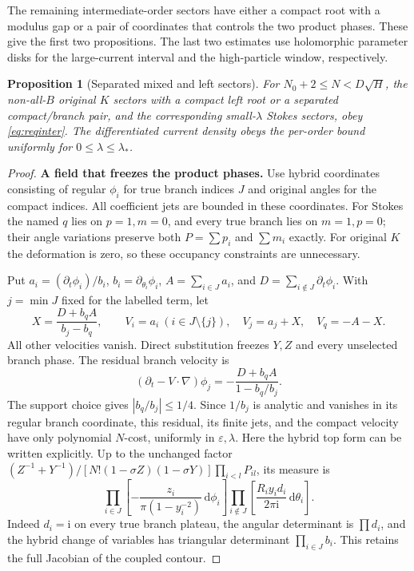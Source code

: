 \documentclass[11pt]{article}
\numberwithin{equation}{section}
\newtheorem{proposition}[theorem]{Proposition}
\theoremstyle{definition}
\newcommand{\dd}{\,\mathrm d}
\newcommand{\ii}{\mathrm i}
\newcommand{\eps}{\varepsilon}
\begin{document}
The remaining intermediate-order sectors have either a compact root
with a modulus gap or a pair of coordinates that controls the two
product phases. These give the first two propositions. The last two
estimates use holomorphic parameter disks for the large-current
interval and the high-particle window, respectively.
\begin{proposition}[Separated mixed and left sectors]\label{prop:mixed}
For \(N_0+2\le N<D\sqrt H\), the non-all-\(B\) original \(K\)
sectors with a compact left root or a separated compact/branch
pair, and the corresponding small-\(\lambda\) Stokes sectors,
obey \eqref{eq:reqinter}. The differentiated current density
obeys the per-order bound uniformly for \(0\le\lambda\le\lambda_*\).
\end{proposition}
\begin{proof}
\noindent\textbf{A field that freezes the product phases.} Use hybrid coordinates consisting of regular \(\phi_i\) for true
branch indices \(J\) and original angles for the compact indices.
All coefficient jets are bounded in these coordinates.
For Stokes the named \(q\) lies on \(p=1,m=0\), and every true
branch lies on \(m=1,p=0\); their angle variations preserve both
\(P=\sum p_i\) and \(\sum m_i\) exactly.
For original \(K\) the deformation is zero, so these occupancy
constraints are unnecessary.

Put \(a_i=(\partial_t\phi_i)/b_i\),
\(b_i=\partial_{\theta_i}\phi_i\),
\(A=\sum_{i\in J}a_i\), and
\(D=\sum_{i\notin J}\partial_t\phi_i\).
With \(j=\min J\) fixed for the labelled term, let
\[
 X=\frac{D+b_qA}{b_j-b_q},\qquad
 V_i=a_i\ (i\in J\setminus\{j\}),\quad
 V_j=a_j+X,\quad V_q=-A-X .
 \]
All other velocities vanish. Direct substitution freezes \(Y,Z\)
and every unselected branch phase. The residual branch velocity is
\[
 (\partial_t-V\cdot\nabla)\phi_j
       =-\frac{D+b_qA}{1-b_q/b_j}.
\]
The support choice gives \(|b_q/b_j|\le1/4\).
Since \(1/b_j\) is analytic and vanishes in its regular branch
coordinate, this residual, its finite jets, and the compact
velocity have only polynomial \(N\)-cost, uniformly in \(\eps,\lambda\).
Here the hybrid top form can be written explicitly. Up to the
unchanged factor \((Z^{-1}+Y^{-1})/[N!(1-\sigma Z)(1-\sigma Y)]\prod_{i<l}P_{il}\),
its measure is
\[
 \prod_{i\in J}\left[-\frac{z_i}{\pi(1-y_i^{-2})}\dd\phi_i\right]
 \prod_{i\notin J}\left[\frac{R_i y_i d_i}{2\pi\ii}\dd\theta_i\right].
\]
Indeed \(d_i=\ii\) on every true branch plateau, the angular
determinant is \(\prod d_i\), and the hybrid change of variables
has triangular determinant \(\prod_{i\in J}b_i\).
This retains the full Jacobian of the coupled contour.


\end{proof}
\end{document}
